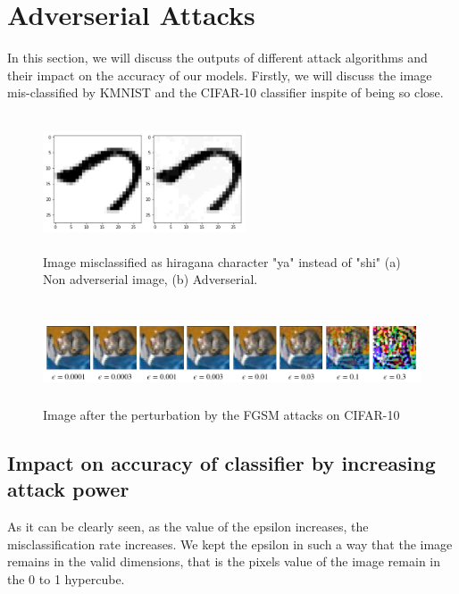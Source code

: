 \documentclass[11pt]{article}
\begin{document}
\section{Adverserial Attacks}
In this section, we will discuss the outputs of different attack algorithms and their impact on the accuracy of our models. Firstly, we will discuss the image mis-classified by KMNIST and the CIFAR-10 classifier inspite of being so close. 
\begin{center}
        \begin{figure}[h]
        \centering
          \includegraphics[width=60mm, height=40mm]{attack_FGSM_unt_kuzu.png}
          \caption{ Image misclassified as hiragana character "ya" instead of "shi" (a) Non adverserial image, (b) Adverserial.
          }
          \label{fig:Piston}
        \end{figure}
\end{center}

\begin{center}
        \begin{figure}[!h]
        \centering
          \includegraphics[width=150mm, height=30mm]{adverserial_examples_CIFAR_FGSM.png}
          \caption{ Image after the perturbation by the FGSM attacks on CIFAR-10
          }
          
          \label{fig:Piston}
        \end{figure}
\end{center}
\subsection{Impact on accuracy of classifier by increasing attack power}  

As it can be clearly seen, as the value of the epsilon increases, the misclassification rate increases. We kept the epsilon in such a way that the image remains in the valid dimensions, that is the pixels value of the image remain in the 0 to 1 hypercube. 
\end{document}
